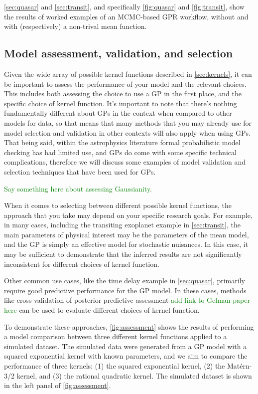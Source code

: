 \documentclass[letterpaper]{ar-1col}
\newcommand{\dan}[1]{\textcolor{green}{#1}}
\begin{document}
\autoref{sec:quasar} and \autoref{sec:transit}, and specifically \autoref{fig:quasar} and \autoref{fig:transit}, show the results of worked examples of an MCMC-based GPR workflow, without and with (respectively) a non-trival mean function.


\subsection{Model assessment, validation, and selection}

Given the wide array of possible kernel functions described in \autoref{sec:kernels}, it can be important to assess the performance of your model and the relevant choices.
This includes both assessing the choice to use a GP in the first place, and the specific choice of kernel function.
It's important to note that there's nothing fundamentally different about GPs in the context when compared to other models for data, so that means that many methods that you may already use for model selection and validation in other contexts will also apply when using GPs.
That being said, within the astrophysics literature formal probabilistic model checking has had limited use, and GPs do come with some specific technical complications, therefore we will discuss some examples of model validation and selection techniques that have been used for GPs.

\dan{Say something here about assessing Gaussianity.}

When it comes to selecting between different possible kernel functions, the approach that you take may depend on your specific research goals.
For example, in many cases, including the transiting exoplanet example in \autoref{sec:transit}, the main parameters of physical interest may be the parameters of the mean model, and the GP is simply an effective model for stochastic nuisances.
In this case, it may be sufficient to demonstrate that the inferred results are not significantly inconsistent for different choices of kernel function.

Other common use cases, like the time delay example in \autoref{sec:quasar}, primarily require good predictive performance for the GP model.
In these cases, methods like cross-validation of posterior predictive assessment \dan{add link to Gelman paper here} can be used to evaluate different choices of kernel function.

To demonstrate these approaches, \autoref{fig:assessment} shows the results of performing a model comparison between three different kernel functions applied to a simulated dataset.
The simulated data were generated from a GP model with a squared exponential kernel with known parameters, and we aim to compare the performance of three kernels: (1) the squared exponential kernel, (2) the Mat\'ern-3/2 kernel, and (3) the rational quadratic kernel.
The simulated dataset is shown in the left panel of \autoref{fig:assessment}.
\end{document}
